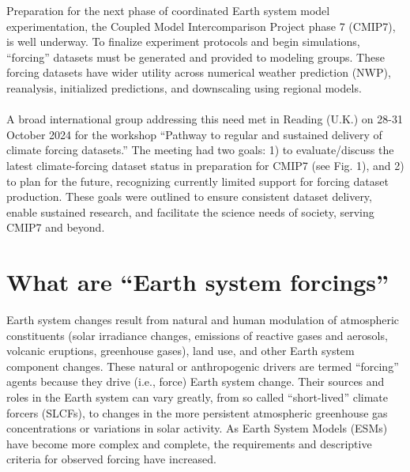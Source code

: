 \documentclass{ametsocV6.1}
\begin{document}

Preparation for the next phase of coordinated Earth system model experimentation, the Coupled Model Intercomparison Project phase 7 (CMIP7), is well underway. To finalize experiment protocols and begin simulations, ``forcing'' datasets must be generated and provided to modeling groups. These forcing datasets have wider utility across numerical weather prediction (NWP), reanalysis, initialized predictions, and downscaling using regional models. \\ 
\\
A broad international group addressing this need met in Reading (U.K.) on 28-31 October 2024 for the workshop ``Pathway to regular and sustained delivery of climate forcing datasets.'' The meeting had two goals: 1) to evaluate/discuss the latest climate-forcing dataset status in preparation for CMIP7 (see Fig. 1), and 2) to plan for the future, recognizing currently limited support for forcing dataset production. These goals were outlined to ensure consistent dataset delivery, enable sustained research, and facilitate the science needs of society, serving CMIP7 and beyond.

\section*{What are ``Earth system forcings''}
Earth system changes result from natural and human modulation of atmospheric constituents (solar irradiance changes, emissions of reactive gases and aerosols, volcanic eruptions, greenhouse gases), land use, and other Earth system component changes. These natural or anthropogenic drivers are termed ``forcing'' agents because they drive (i.e., force) Earth system change. Their sources and roles in the Earth system can vary greatly, from so called ``short-lived'' climate forcers (SLCFs), to changes in the more persistent atmospheric greenhouse gas concentrations or variations in solar activity. As Earth System Models (ESMs) have become more complex and complete, the requirements and descriptive criteria for observed forcing have increased.
\end{document}
